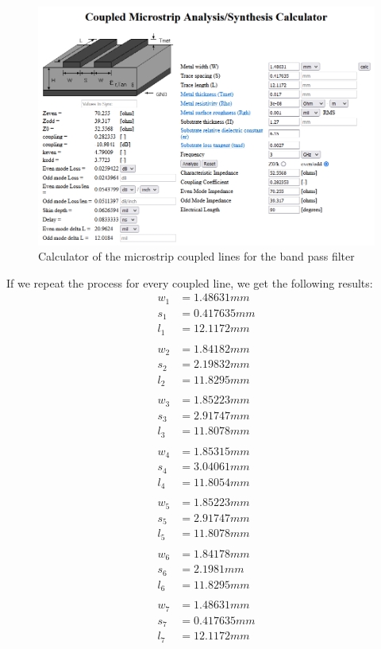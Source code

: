 \documentclass[12pt]{report} %
\begin{document}
\begin{figure}[htbp]
    \centering
    \includegraphics[width=1\linewidth]{images//microstrip_elements/filter_band_pass_microstrip_calculator.png}
    \caption{Calculator of the microstrip coupled lines for the band pass filter}
    \label{fig:microstrip_elements:filter_band_pass_microstrip_calculator}
\end{figure}

If we repeat the process for every coupled line, we get the following results:
\begin{align*}
w_1 &= 1.48631 mm\\
s_1 &= 0.417635 mm \\
l_1 &= 12.1172 mm \\
\\
w_2 &= 1.84182 mm \\
s_2 &= 2.19832 mm \\
l_2 &= 11.8295 mm \\
\\
w_3 &= 1.85223 mm \\
s_3 &= 2.91747 mm \\
l_3 &= 11.8078 mm \\
\\
w_4 &= 1.85315 mm \\
s_4 &= 3.04061 mm \\
l_4 &= 11.8054 mm \\
\\
w_5 &= 1.85223 mm \\
s_5 &= 2.91747 mm \\
l_5 &= 11.8078 mm \\
\\
w_6 &= 1.84178 mm \\
s_6 &= 2.1981 mm \\
l_6 &= 11.8295 mm \\
\\
w_7 &= 1.48631 mm \\
s_7 &= 0.417635 mm \\
l_7 &= 12.1172 mm \\
\end{align*}
\end{document}
